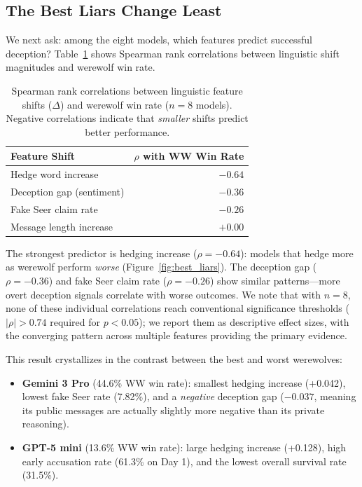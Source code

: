 \subsection{The Best Liars Change Least}
\label{sec:best_liars}

We next ask: among the eight models, which features predict successful deception? Table~\ref{tab:correlations} shows Spearman rank correlations between linguistic shift magnitudes and werewolf win rate.

\begin{table}[t]
\caption{Spearman rank correlations between linguistic feature shifts ($\Delta$) and werewolf win rate ($n = 8$ models). Negative correlations indicate that \emph{smaller} shifts predict better performance.}
\label{tab:correlations}
\centering
\small
\begin{tabular}{lr}
\toprule
\textbf{Feature Shift} & \textbf{$\rho$ with WW Win Rate} \\
\midrule
Hedge word increase & $-0.64$ \\
Deception gap (sentiment) & $-0.36$ \\
Fake Seer claim rate & $-0.26$ \\
Message length increase & $+0.00$ \\
\bottomrule
\end{tabular}
\end{table}

The strongest predictor is hedging increase ($\rho = -0.64$): models that hedge more as werewolf perform \emph{worse} (Figure~\ref{fig:best_liars}). The deception gap ($\rho = -0.36$) and fake Seer claim rate ($\rho = -0.26$) show similar patterns---more overt deception signals correlate with worse outcomes. We note that with $n = 8$, none of these individual correlations reach conventional significance thresholds ($|\rho| > 0.74$ required for $p < 0.05$); we report them as descriptive effect sizes, with the converging pattern across multiple features providing the primary evidence.

This result crystallizes in the contrast between the best and worst werewolves:
\begin{itemize}
    \item \textbf{Gemini 3 Pro} (44.6\% WW win rate): smallest hedging increase (+0.042), lowest fake Seer rate (7.82\%), and a \emph{negative} deception gap ($-0.037$, meaning its public messages are actually slightly more negative than its private reasoning).
    \item \textbf{GPT-5 mini} (13.6\% WW win rate): large hedging increase (+0.128), high early accusation rate (61.3\% on Day 1), and the lowest overall survival rate (31.5\%).
\end{itemize}

